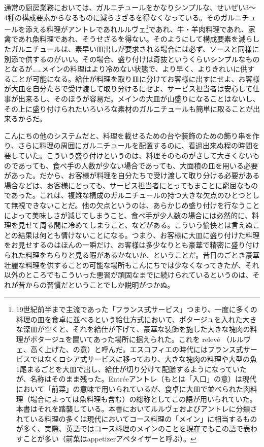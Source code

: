 \begin{main}
通常の厨房業務においては、ガルニチュールをかなりシンプルな、せいぜい3〜
4種の構成要素からなるものに減らさざるを得なくなっている。そのガルニチュールを添える料理がアントレであれルルヴェ\footnote{19世紀前半まで主流であった「フランス式サービス」つまり、一度に多くの料理の皿を食卓に並べるという給仕方式において、ポタージュを入れた大きな深皿が空くと、それを給仕が下げて、豪華な装飾を施した大きな塊肉の料理がポタージュを置いてあった場所に据えられた。これを
  relevé
  （ルルヴェ、高く上げた、の意）と呼んだ。エスコフィエの時代にはフランス式サービスではなくロシア式サービスに移っており、大きな塊肉の料理や大型の魚1尾まるごとを大皿で出し、給仕が切り分けて配膳するようになっていたが、名称はそのまま残った。Entréeアントレ（もとは「入口」の意）は現代において「前菜」の意味で用いられているが、食卓に大皿で並べられた肉料理（場合によっては魚料理も含む）の総称としてこの語が用いられていた。本書はそれを踏襲している。本書においてルルヴェおよびアントレに分類されている料理の多くは現代においてコース料理の「メイン」に相当するものが多く、実際、英語ではコース料理のメインのことを現在でもこの語で表わすことが多い（前菜はappetizerアペタイザーと呼ぶ）。}であれ、牛・羊肉料理であれ、家禽であれ魚料理であれ、そうせざるを得ない。そのようにして構成要素を減らしたガルニチュールは、素早い皿出しが要求される場合には必ず、ソースと同様に別添で供するのがいい。その場合、盛り付けは奇抜というくらいシンプルなものとなるが\ldots{}\ldots{}メインの料理はより冷めない状態で、より早く、よりきれいに供することが可能になる。給仕が料理を取り皿に分けてお客様に出すにせよ、お客様が大皿を自分たちで受け渡して取り分けるにせよ、サービス担当者は安心して仕事が出来るし、そのほうが容易だ。メインの大皿が山盛りになることはないし、その上に盛り付けられたいろいろな素材のガルニチュールも簡単に取ることが出来るからだ。

こんにちの他のシステムだと、料理を載せるための台や装飾のための飾り串を作り、さらに料理の周囲にガルニチュールを配置するのに、看過出来ぬ程の時間を要していた。こういう盛り付けというのは、料理そのものがさして大きくないものであっても、食べ手の人数が少ない場合であっても、大面積の皿を用いる必要があった。だから、お客様が料理を自分たちで受け渡して取り分ける必要がある場合などは、お客様にとっても、サービス担当者にとってもまことに窮屈なものであった。これは、複雑な構成のガルニチュールの持つ大きな欠点のひとつとして無視できないことだ。他の欠点というのは、あらかじめ盛り付けを行なうことによって美味しさが減じてしまうこと、食べ手が少人数の場合には必然的に、料理を見せて周る間に冷めてしまうこと、などがある。こういう愉快とは言えぬことの結果は何とも情けないことになる。つまり、お客様に大皿に盛り付けた料理をお見せするのはほんの一瞬だけ、お客様は多少なりとも豪華で精密に盛り付けられた料理をちらりと見る暇があるかないか、ということだ。昔日のごとき豪華壮麗な料理を供することの可能な場所もこんにちでは少なくなってきたが、それ以外のところでもこういった悪習が頑固なまでに続けられているというのは、それが昔からの習慣だということでしか説明がつかぬ。


\end{main}

